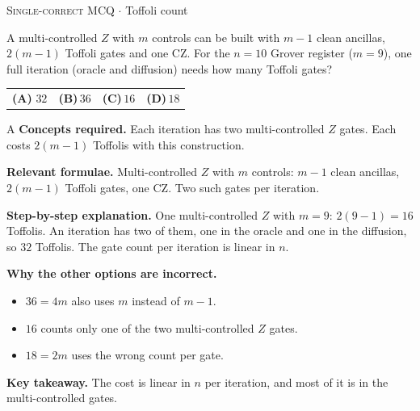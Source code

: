 \documentclass[11pt,a4paper]{article}
\newcommand{\optlabel}[1]{\textbf{(#1)}}
\newcommand{\correctlabel}[1]{\textcolor{okgreen}{\textbf{(#1)}\,\ding{51}}}
\newenvironment{qitem}[1]{\begin{list}{}{\setlength{\leftmargin}{3.3em}\setlength{\labelwidth}{3.1em}%
  \setlength{\labelsep}{0.2em}\setlength{\topsep}{3pt}\setlength{\parsep}{3pt}}\item[\textbf{Q.#1}\hfill]}{\end{list}}
\newcommand{\qsep}{\par\vspace{2pt}{\color{black!15}\hrule}\vspace{4pt}}
\newcommand{\qmeta}[2]{{\footnotesize\color{black!60}\textsc{#1} \;$\cdot$\; #2}\par}
\begin{document}
\begin{qitem}{70}
\qmeta{Single-correct MCQ}{Toffoli count}
A multi-controlled $Z$ with $m$ controls can be built with $m - 1$ clean ancillas, $2(m-1)$ Toffoli gates and one CZ. For the $n = 10$ Grover register ($m = 9$), one full iteration (oracle and diffusion) needs how many Toffoli gates?
\par\smallskip\noindent\begin{tabularx}{\linewidth}{@{}*{4}{L}@{}}
\correctlabel{A}\,$32$ & \optlabel{B}\,$36$ & \optlabel{C}\,$16$ & \optlabel{D}\,$18$
\end{tabularx}
\end{qitem}
\begin{solbox}{A}
\textbf{\color{brand}Concepts required.} Each iteration has two multi-controlled $Z$ gates. Each costs $2(m-1)$ Toffolis with this construction.

\textbf{\color{brand}Relevant formulae.} Multi-controlled $Z$ with $m$ controls: $m - 1$ clean ancillas, $2(m - 1)$ Toffoli gates, one CZ. Two such gates per iteration.

\textbf{\color{brand}Step-by-step explanation.} One multi-controlled $Z$ with $m = 9$: $2(9 - 1) = 16$ Toffolis. An iteration has two of them, one in the oracle and one in the diffusion, so $32$ Toffolis. The gate count per iteration is linear in $n$.

\textbf{\color{brand}Why the other options are incorrect.}
\begin{itemize}[leftmargin=2.4em, itemsep=1pt, topsep=2pt]
\item[\textbf{(B)}] $36 = 4m$ also uses $m$ instead of $m - 1$.
\item[\textbf{(C)}] $16$ counts only one of the two multi-controlled $Z$ gates.
\item[\textbf{(D)}] $18 = 2m$ uses the wrong count per gate.
\end{itemize}
\textbf{\color{brand}Key takeaway.} The cost is linear in $n$ per iteration, and most of it is in the multi-controlled gates.
\end{solbox}
\qsep
\end{document}
